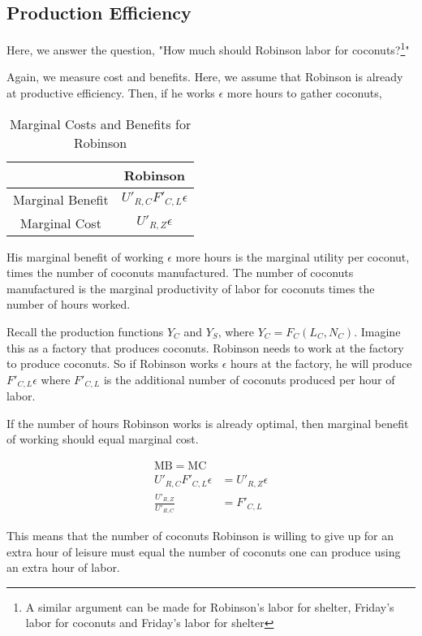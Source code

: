 \documentclass[11pt]{scrartcl}
\begin{document}
\subsection{Production Efficiency}

Here, we answer the question, "How much should Robinson labor for coconuts?\footnote{A similar argument can be made for Robinson's labor for shelter, Friday's labor for coconuts and Friday's labor for shelter}"

Again, we measure cost and benefits. Here, we assume that Robinson is already at productive efficiency. Then, if he works $\epsilon$ more hours to gather coconuts,

\begin{table}[ht!]
\begin{longtable}{c|c}
\hline
 & Robinson \\
\hline
Marginal Benefit & $U'_{R,C} F'_{C,L} \epsilon$ \\
Marginal Cost & $U'_{R,Z} \epsilon$ \\
\hline
\end{longtable}
\caption{Marginal Costs and Benefits for Robinson}
\end{table}

His marginal benefit of working $\epsilon$ more hours is the marginal utility per coconut, times the number of coconuts manufactured. The number of coconuts manufactured is the marginal productivity of labor for coconuts times the number of hours worked. 

Recall the production functions $Y_C$ and $Y_S$, where $Y_C = F_C(L_C, N_C)$. Imagine this as a factory that produces coconuts. Robinson needs to work at the factory to produce coconuts. So if Robinson works $\epsilon$ hours at the factory, he will produce $F'_{C,L} \epsilon$ where $F'_{C,L}$ is the additional number of coconuts produced per hour of labor. 

If the number of hours Robinson works is already optimal, then marginal benefit of working should equal marginal cost.

\begin{align*}
\mathrm{MB} = \mathrm{MC}\\
U'_{R,C} F'_{C,L} \epsilon &= U'_{R,Z} \epsilon \\
\frac{U'_{R,Z}}{U'_{R,C}} &= F'_{C,L}
\end{align*}

This means that the number of coconuts Robinson is willing to give up for an extra hour of leisure must equal the number of coconuts one can produce using an extra hour of labor. 
\end{document}
